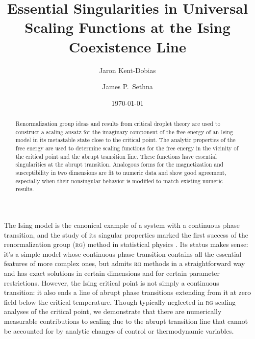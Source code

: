 \documentclass[aps,prl,reprint]{revtex4-1}
\begin{document}
\title{Essential Singularities in Universal Scaling Functions at the Ising Coexistence Line}
\author{Jaron Kent-Dobias}
\author{James P.~Sethna}

\date\today

\begin{abstract}
  Renormalization group ideas and results from critical droplet theory are
  used to construct a scaling ansatz for the imaginary component of the free
  energy of an Ising model in its metastable state close to the critical
  point. The analytic properties of the free energy are used to determine
  scaling functions for the free energy in the vicinity of the critical point
  and the abrupt transition line. These functions have essential singularities
  at the abrupt transition. Analogous forms for the magnetization and susceptibility in
  two dimensions are fit to numeric data and show good agreement, especially
  when their nonsingular behavior is modified to match existing numeric results.
\end{abstract}

\maketitle

The Ising model is the canonical example of a system with a continuous phase
transition, and the study of its singular properties marked the first success
of the renormalization group (\textsc{rg}) method in statistical physics
\cite{wilson.1971.renormalization}. Its status makes sense: it's a simple
model whose continuous phase transition contains all the essential features of
more complex ones, but admits \textsc{rg} methods in a straightforward way and
has exact solutions in certain dimensions and for certain parameter
restrictions. However, the Ising critical point is not simply a continuous
transition: it also ends a line of abrupt phase transitions extending from it
at zero field below the critical temperature. Though typically neglected in
\textsc{rg} scaling analyses of the critical point, we demonstrate that there
are numerically measurable contributions to scaling due to the abrupt
transition line that cannot be accounted for by analytic changes of control or
thermodynamic variables.
\end{document}
